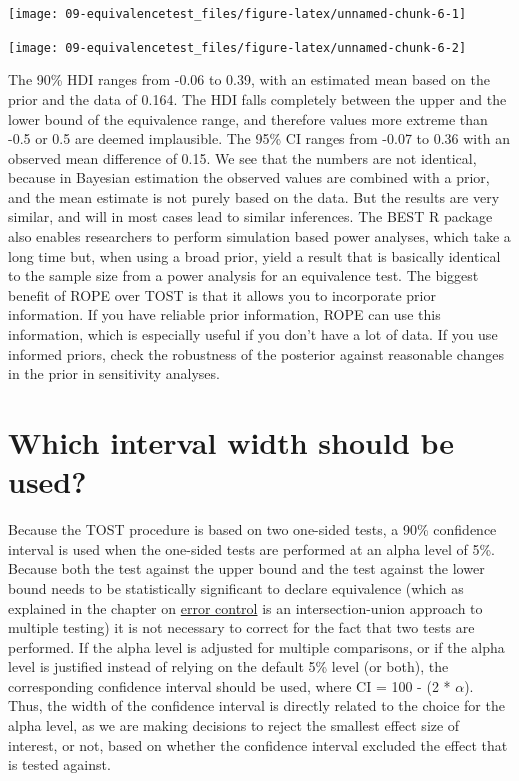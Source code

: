 \documentclass[
  oneside]{krantz}
\begin{document}
\begin{center}\texttt{[image: 09-equivalencetest\_files/figure-latex/unnamed-chunk-6-1]} \end{center}

\begin{center}\texttt{[image: 09-equivalencetest\_files/figure-latex/unnamed-chunk-6-2]} \end{center}

The 90\% HDI ranges from -0.06 to 0.39, with an estimated mean based on the prior and the data of 0.164. The HDI falls completely between the upper and the lower bound of the equivalence range, and therefore values more extreme than -0.5 or 0.5 are deemed implausible. The 95\% CI ranges from -0.07 to 0.36 with an observed mean difference of 0.15. We see that the numbers are not identical, because in Bayesian estimation the observed values are combined with a prior, and the mean estimate is not purely based on the data. But the results are very similar, and will in most cases lead to similar inferences. The BEST R package also enables researchers to perform simulation based power analyses, which take a long time but, when using a broad prior, yield a result that is basically identical to the sample size from a power analysis for an equivalence test. The biggest benefit of ROPE over TOST is that it allows you to incorporate prior information. If you have reliable prior information, ROPE can use this information, which is especially useful if you don't have a lot of data. If you use informed priors, check the robustness of the posterior against reasonable changes in the prior in sensitivity analyses.

\hypertarget{whichinterval}{%
\section{Which interval width should be used?}\label{whichinterval}}

Because the TOST procedure is based on two one-sided tests, a 90\% confidence interval is used when the one-sided tests are performed at an alpha level of 5\%. Because both the test against the upper bound and the test against the lower bound needs to be statistically significant to declare equivalence (which as explained in the chapter on \protect\hyperlink{multiplecomparisons}{error control} is an intersection-union approach to multiple testing) it is not necessary to correct for the fact that two tests are performed. If the alpha level is adjusted for multiple comparisons, or if the alpha level is justified instead of relying on the default 5\% level (or both), the corresponding confidence interval should be used, where CI = 100 - (2 * \(\alpha\)). Thus, the width of the confidence interval is directly related to the choice for the alpha level, as we are making decisions to reject the smallest effect size of interest, or not, based on whether the confidence interval excluded the effect that is tested against.
\end{document}

